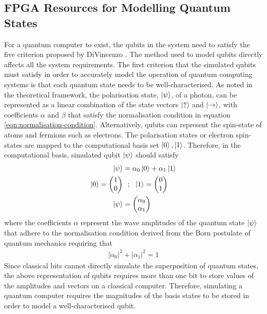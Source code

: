 \subsection{FPGA Resources for Modelling Quantum States \label{subsec:req-sim-qubits}}

For a quantum computer to exist, the qubits in the system need to satisfy the five criterion proposed by DiVincenzo \cite{divincenzo2000physical}. The method used to model qubits directly affects all the  system requirements. The first criterion that the simulated qubits must satisfy in order to accurately model the operation of quantum computing systems is that each quantum state needs to be well-characterised. As noted in the theoretical framework, the polarisation state, $\ket{\psi}$, of a photon, can be represented as a linear combination of the state vectors $\ket{\uparrow}$ and $\ket{\rightarrow}$, with coefficients $\alpha$ and $\beta$ that satisfy the normalisation condition in equation \ref{eqn:normalisation-condition}. Alternatively, qubits can represent the spin-state of atoms and fermions such as electrons. The polarisation states or electron spin-states are mapped to the computational basis set ${\ket{0}, \ket{1}}$. Therefore, in the computational basis, simulated qubit $\ket{\psi}$ should satisfy
\begin{align}\label{eqn:qstate-comp-basis}
	\ket{\psi}	& = \alpha_0\ket{0} + \alpha_1\ket{1}\nonumber\\
	\ket{0} = \left(\begin{matrix}
		1 \\ 0
	\end{matrix}\right)&~~;~~\ket{1} = \left(\begin{matrix}
	0 \\ 1
\end{matrix}\right)\nonumber\\
\ket{\psi} & = \left(\begin{matrix}
	\alpha_0\\
	\alpha_1
\end{matrix}\right)
\end{align}
where the coefficients $\alpha$ represent the wave amplitudes of the quantum state $\ket{\psi}$ that adhere to the normalisation condition derived from the Born postulate of quantum mechanics requiring that
\begin{align}
	|\alpha_0|^2 + |\alpha_1|^2 = 1\nonumber
\end{align}
Since classical bits cannot directly simulate the superposition of quantum states, the above representation of qubits requires more than one bit to store values of the amplitudes and vectors on a classical computer. Therefore, simulating a quantum computer requires the magnitudes of the basis states to be stored in order to model a well-characterised qubit. 

